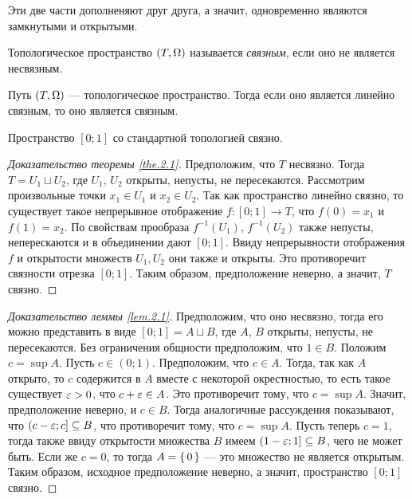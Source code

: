 \documentclass[main]{subfiles}
\begin{document}
\begin{remark}
	Эти две части дополненяют друг друга, а значит, одновременно являются замкнутыми и открытыми.
\end{remark}

\begin{definition}
	Топологическое пространство $ (T, \Omega) $ называется \emph{связным}, если оно не является несвязным.
\end{definition}

\begin{theorem} \label{the.2.1}
	Путь $ (T, \Omega) $ --- топологическое пространство. Тогда если оно является линейно связным, то оно является связным.
\end{theorem}

\begin{lemma} \label{lem.2.1}
	Пространство $[0; 1]$ со стандартной топологией связно.
\end{lemma}

\begin{proof}[Доказательство теоремы \ref{the.2.1}]
	Предположим, что $ T $ несвязно. Тогда $ T = U_1 \sqcup U_2 $, где $ U_1 $, $ U_2 $ открыты, непусты, не
	пересекаются. Рассмотрим произвольные точки $ x_1 \in U_1 $ и $ x_2 \in U_2 $. Так как пространство линейно
	связно, то существует такое непрерывное отображение $ f \colon [0; 1] \to T $, что $ f(0) = x_1 $ и $ f(1) = x_2 $.
	По свойствам прообраза $ f^{-1}(U_1) $, $ f^{-1}(U_2) $ также непусты, неперескаются и в объединении дают
	$[ 0; 1] $. Ввиду непрерывности отображения $ f $ и открытости множеств $ U_1, U_2 $ они также и открыты.
	Это противоречит связности отрезка $ [0; 1] $. Таким образом, предположение неверно, а значит, $ T $ связно.
\end{proof}

\begin{proof}[Доказательство леммы \ref{lem.2.1}] Предположим, что оно несвязно, тогда его можно представить в виде
	$ [0; 1] = A \sqcup B $, где $ A $, $ B $ открыты, непусты, не пересекаются. Без ограничения общности предположим,
	что $ 1 \in B $. Положим $ c = \sup A $. Пусть $ c \in (0; 1) $. Предположим, что $ c \in A $.
	Тогда, так как $ A $ открыто, то $ c $ содержится в $ A $ вместе с некоторой окрестностью,
	то есть такое существует $ \varepsilon > 0 $, что $ c + \varepsilon \in A $. Это противоречит тому, что $ c = \sup A $.
	Значит, предположение неверно, и $ c \in B $. Тогда аналогичные рассуждения показывают, что
	$ (c - \varepsilon; c] \subseteq B $, что противоречит тому, что $ c = \sup A $. Пусть теперь $ c = 1 $, тогда также ввиду
	открытости множества $ B $ имеем $ (1 - \varepsilon; 1] \subseteq B $, чего не может быть. Если же $ c = 0 $, то тогда
	$ A = \left\{\,0\,\right\} $ --- это множество не является открытым.	Таким образом, исходное предположение неверно,
	а значит, пространство $ [0; 1] $ связно.
\end{proof}
\end{document}
